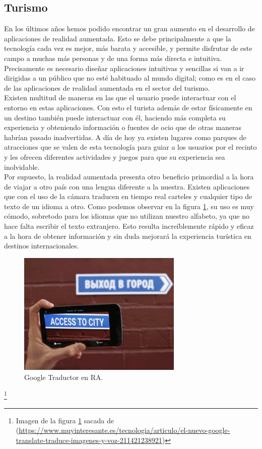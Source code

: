 \subsection{Turismo}
En los últimos años hemos podido encontrar un gran aumento en el desarrollo de aplicaciones de realidad aumentada. Esto se debe principalmente a que la tecnología cada vez es mejor, más barata y accesible, y permite disfrutar de este campo a muchas más personas y de una forma más directa e intuitiva. Precisamente es necesario diseñar aplicaciones intuitivas y sencillas si van a ir dirigidas a un público que no esté habituado al mundo digital; como es en el caso de las aplicaciones de realidad aumentada en el sector del turismo.\cite{Neosentec_Tur}\\

Existen multitud de maneras en las que el usuario puede interactuar con el entorno en estas aplicaciones. Con esto el turista además de estar físicamente en un destino también puede interactuar con él, haciendo más completa su experiencia y obteniendo información o fuentes de ocio que de otras maneras habrían pasado inadvertidas. A día de hoy ya existen lugares como parques de atracciones que se valen de esta tecnología para guiar a los usuarios por el recinto y les ofrecen diferentes actividades y juegos para que su experiencia sea inolvidable.\\

Por supuesto, la realidad aumentada presenta otro beneficio primordial a la hora de viajar a otro país con una lengua diferente a la nuestra. Existen aplicaciones que con el uso de la cámara traducen en tiempo real carteles y cualquier tipo de texto de un idioma a otro. Como podemos observar en la figura \ref{fig:googletranslate}, su uso es muy cómodo, sobretodo para los idiomas que no utilizan nuestro alfabeto, ya que no hace falta escribir el texto extranjero. Esto resulta increíblemente rápido y eficaz a la hora de obtener información y sin duda mejorará la experiencia turística en destinos internacionales.

\begin{figure}[H]
     \centering
     \includegraphics[width=0.7\textwidth]{Images/google-translate.jpg}
     \caption{Google Traductor en RA.}
     \label{fig:googletranslate}
 \end{figure}
 {\let\thefootnote\relax\footnote{{Imagen de la figura \ref{fig:googletranslate} sacada de (\url{https://www.muyinteresante.es/tecnologia/articulo/el-nuevo-google-translate-traduce-imagenes-y-voz-211421238921})}}}


